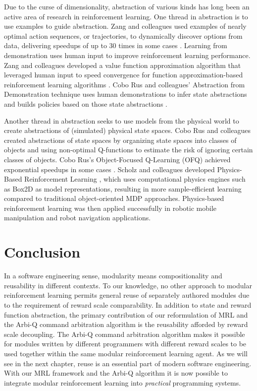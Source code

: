 Due to the curse of dimensionality, abstraction of various kinds has long been an active area of research in reinforcement learning. One thread in abstraction is to use examples to guide abstraction. Zang and colleagues used examples of nearly optimal action sequences, or trajectories, to dynamically discover options from data, delivering speedups of up to 30 times in some cases \cite{zang2009discovering}. Learning from demonstration \cite{zang2010batch} uses human input to improve reinforcement learning performance. Zang and colleagues developed a value function approximation algorithm that leveraged human input to speed convergence for function approximation-based reinforcement learning algorithms \cite{zang2010using}. Cobo Rus and colleagues' Abstraction from Demonstration technique uses human demonstrations to infer state abstractions and builds policies based on those state abstractions \cite{cobo-rus2011automatic,cobo-rus2012automatic,cobo-rus2014abstraction}.

Another thread in abstraction seeks to use models from the physical world to create abstractions of (simulated) physical state spaces. Cobo Rus and colleagues created abstractions of state spaces by organizing state spaces into classes of objects and using non-optimal Q-functions to estimate the risk of ignoring certain classes of objects. Cobo Rus's Object-Focused Q-Learning (OFQ) achieved exponential speedups in some cases \cite{cobo-rus2013object}. Scholz and colleagues developed Physics-Based Reinforcement Learning \cite{scholz2014physics}, which uses computational physics engines such as Box2D \cite{catto2013box2d} as model representations, resulting in more sample-efficient learning compared to traditional object-oriented MDP approaches. Physics-based reinforcement learning was then applied successfully in robotic mobile manipulation \cite{scholz2015learning} and robot navigation \cite{scholz2016navigating} applications.


\section{Conclusion}

In a software engineering sense, modularity means compositionality and reusability in different contexts. To our knowledge, no other approach to modular reinforcement learning permits general reuse of separately authored modules due to the requirement of reward scale comparability. In addition to state and reward function abstraction, the primary contribution of our reformulation of MRL and the Arbi-Q command arbitration algorithm is the reusability afforded by reward scale decoupling. The Arbi-Q command arbitration algorithm makes it possible for modules written by different programmers with different reward scales to be used together within the same modular reinforcement learning agent. As we will see in the next chapter, reuse is an essential part of modern software engineering. With our MRL framework and the Arbi-Q algorithm it is now possible to integrate modular reinforcement learning into {\it practical} programming systems.
